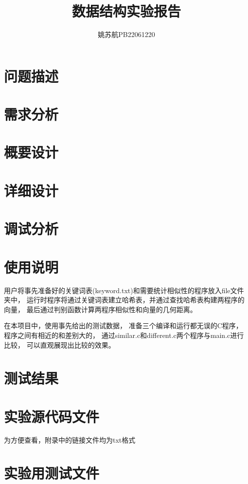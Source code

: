 \documentclass[a4paper]{article}
\title{\textbf{数据结构实验报告}}
\author{姚苏航\qquad PB22061220}
\date{}
\begin{document}
	\maketitle


	\section{问题描述}\label{sec:des}
	


	\section{需求分析}\label{sec:need}
	


	\section{概要设计}\label{sec:design1}
	


	\section{详细设计}\label{sec:design2}
	


	\section{调试分析}\label{sec:debug}
	


	\section{使用说明}\label{sec:instrut}
	{{用户将事先准备好的关键词表(keyword.txt)和需要统计相似性的程序放入file文件夹中，
	运行时程序将通过关键词表建立哈希表，并通过查找哈希表构建两程序的向量，
	最后通过判别函数计算两程序相似性和向量的几何距离。}}

	{{在本项目中，使用事先给出的测试数据，
	准备三个编译和运行都无误的C程序，程序之间有相近的和差别大的，
	通过similar.c和different.c两个程序与main.c进行比较，
	可以直观展现出比较的效果。}}


	\section{测试结果}\label{sec:result}
	


	\section{实验源代码文件}\label{sec:appendix1}
	{{为方便查看，附录中的链接文件均为txt格式}}

	


	\section{实验用测试文件}\label{sec:appendix2}
	
	
\end{document}
